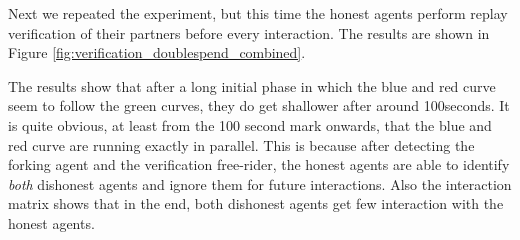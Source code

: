 Next we repeated the experiment, but this time the honest agents perform replay verification of their
partners before every interaction. The results are shown in Figure \ref{fig:verification_doublespend_combined}. 

The results show that after a long initial phase in which the blue and red curve seem to follow 
the green curves, they do get shallower after around 100seconds. It is quite obvious, at least 
from the 100 second mark onwards, that the blue and red curve are running exactly in parallel. This is
because after detecting the forking agent and the verification free-rider, the honest agents are 
able to identify \textit{both} dishonest agents and ignore them for future interactions. Also the interaction
matrix shows that in the end, both dishonest agents get few interaction with the honest agents. 

